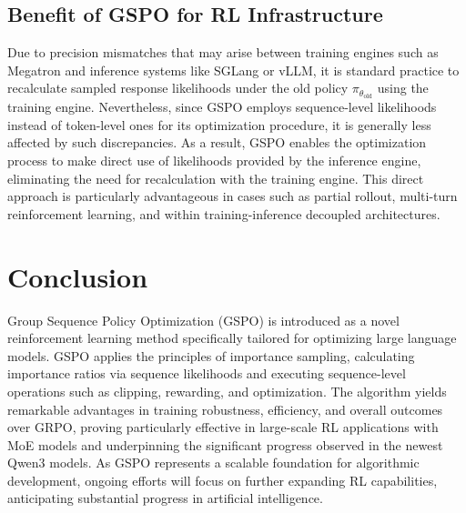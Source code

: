 \subsection{Benefit of GSPO for RL Infrastructure}

Due to precision mismatches that may arise between training engines such as Megatron and inference systems like SGLang or vLLM, it is standard practice to recalculate sampled response likelihoods under the old policy $\pi_{\theta_\text{old}}$ using the training engine. Nevertheless, since GSPO employs sequence-level likelihoods instead of token-level ones for its optimization procedure, it is generally less affected by such discrepancies. As a result, GSPO enables the optimization process to make direct use of likelihoods provided by the inference engine, eliminating the need for recalculation with the training engine. This direct approach is particularly advantageous in cases such as partial rollout, multi-turn reinforcement learning, and within training-inference decoupled architectures.

\section{Conclusion}

Group Sequence Policy Optimization (GSPO) is introduced as a novel reinforcement learning method specifically tailored for optimizing large language models. GSPO applies the principles of importance sampling, calculating importance ratios via sequence likelihoods and executing sequence-level operations such as clipping, rewarding, and optimization. The algorithm yields remarkable advantages in training robustness, efficiency, and overall outcomes over GRPO, proving particularly effective in large-scale RL applications with MoE models and underpinning the significant progress observed in the newest Qwen3 models. As GSPO represents a scalable foundation for algorithmic development, ongoing efforts will focus on further expanding RL capabilities, anticipating substantial progress in artificial intelligence.

